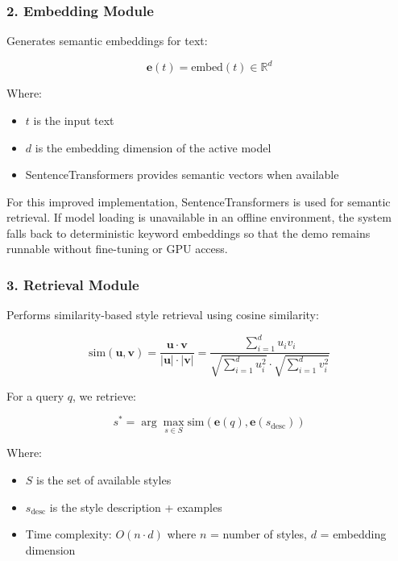 \documentclass[11pt,a4paper]{article}
\begin{document}
\subsubsection{2. Embedding Module}

Generates semantic embeddings for text:

\begin{equation}
\mathbf{e}(t) = \text{embed}(t) \in \mathbb{R}^d
\end{equation}

Where:
\begin{itemize}
    \item $t$ is the input text
    \item $d$ is the embedding dimension of the active model
    \item SentenceTransformers provides semantic vectors when available
\end{itemize}

For this improved implementation, SentenceTransformers is used for semantic retrieval. If model loading is unavailable in an offline environment, the system falls back to deterministic keyword embeddings so that the demo remains runnable without fine-tuning or GPU access.

\subsubsection{3. Retrieval Module}

Performs similarity-based style retrieval using cosine similarity:

\begin{equation}
\text{sim}(\mathbf{u}, \mathbf{v}) = \frac{\mathbf{u} \cdot \mathbf{v}}{|\mathbf{u}| \cdot |\mathbf{v}|} = \frac{\sum_{i=1}^{d} u_i v_i}{\sqrt{\sum_{i=1}^{d} u_i^2} \cdot \sqrt{\sum_{i=1}^{d} v_i^2}}
\end{equation}

For a query $q$, we retrieve:

\begin{equation}
s^* = \arg\max_{s \in S} \text{sim}(\mathbf{e}(q), \mathbf{e}(s_{\text{desc}}))
\end{equation}

Where:
\begin{itemize}
    \item $S$ is the set of available styles
    \item $s_{\text{desc}}$ is the style description + examples
    \item Time complexity: $O(n \cdot d)$ where $n$ = number of styles, $d$ = embedding dimension
\end{itemize}
\end{document}
